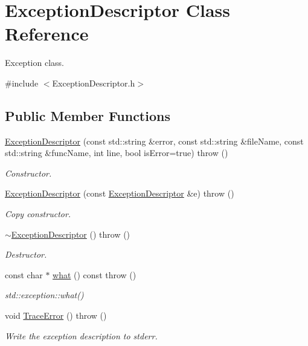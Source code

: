 \hypertarget{class_exception_descriptor}{\section{Exception\-Descriptor Class Reference}
\label{class_exception_descriptor}
}


Exception class.  




{\ttfamily \#include $<$Exception\-Descriptor.\-h$>$}

\subsection*{Public Member Functions}
\begin{DoxyCompactItemize}
\item 
\hyperlink{class_exception_descriptor_abd7c2af705e7d6d9f2310fa676e1a74c}{Exception\-Descriptor} (const std\-::string \&error, const std\-::string \&file\-Name, const std\-::string \&func\-Name, int line, bool is\-Error=true)  throw ()
\begin{DoxyCompactList}\small\item\em Constructor. \end{DoxyCompactList}\item 
\hyperlink{class_exception_descriptor_a0d0840e46e4874851fcb4cb74767eeb3}{Exception\-Descriptor} (const \hyperlink{class_exception_descriptor}{Exception\-Descriptor} \&e)  throw ()
\begin{DoxyCompactList}\small\item\em Copy constructor. \end{DoxyCompactList}\item 
\hyperlink{class_exception_descriptor_ace2f9de889e98240700223988a62cf31}{$\sim$\-Exception\-Descriptor} ()  throw ()
\begin{DoxyCompactList}\small\item\em Destructor. \end{DoxyCompactList}\item 
const char $\ast$ \hyperlink{class_exception_descriptor_a161d74022eac7d6b7b8f72c80e55a53f}{what} () const   throw ()
\begin{DoxyCompactList}\small\item\em std\-::exception\-::what() \end{DoxyCompactList}\item 
void \hyperlink{class_exception_descriptor_a6e2646a61d8b16d9789d09f1b39a21a7}{Trace\-Error} ()  throw ()
\begin{DoxyCompactList}\small\item\em Write the exception description to stderr. \end{DoxyCompactList}\end{DoxyCompactItemize}


